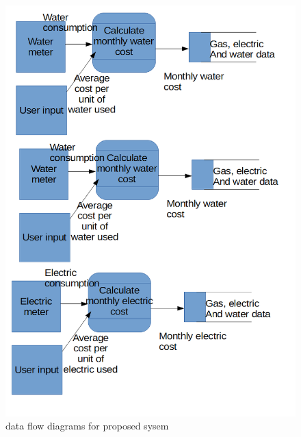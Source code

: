 \begin{figure}[H]
    \includegraphics[width=\textwidth]{./dataflowdiagrams4.png}
    \caption{data flow diagrams for proposed sysem} \label{fig:dataflowdiagrams}
\end{figure}


